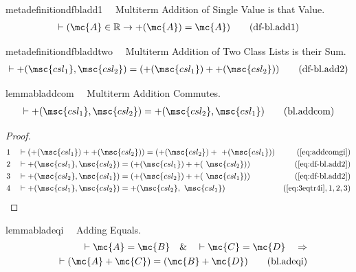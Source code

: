 \begin{restatable}{metadefinition}{dfbladd1}~~ Multiterm Addition of Single Value is
that Value.
\begin{align}
\vdash ( \mc{A} \in \mathbb{R} \rightarrow +( \mc{A} ) = \mc{A}
    )\label{eq:df-bl.add1}\tag{df-bl.add1}
\end{align}
\end{restatable}

\begin{restatable}{metadefinition}{dfbladdtwo}~~ Multiterm Addition of Two Class Lists
is their Sum.
\begin{align}
\vdash +( \msc{csl_1} , \msc{csl_2} ) = ( +( \msc{csl_1} ) + +( \msc{csl_2} )
    )\label{eq:df-bl.add2}\tag{df-bl.add2}
\end{align}
\end{restatable}

\begin{restatable}{lemma}{bladdcom}~~ Multiterm Addition Commutes.
\begin{align}
\vdash +( \msc{csl_1} , \msc{csl_2} ) = +( \msc{csl_2} , \msc{csl_1}
    )\label{eq:bl.addcom}\tag{bl.addcom}
\end{align}
\end{restatable}

\begin{proof}
\begin{align}
  1 &&  & \vdash ( +( \msc{csl_1} ) + +( \msc{csl_2} ) ) = ( +( \msc{csl_2} ) +
     ~+( \msc{csl_1} ) )&(\mbox{\ref{eq:addcomgi}})\notag
  \\ 2 &&  & \vdash +( \msc{csl_1} , \msc{csl_2} ) = ( +( \msc{csl_1} ) + +(
     ~\msc{csl_2} ) )&(\mbox{\ref{eq:df-bl.add2}})\notag
  \\ 3 &&  & \vdash +( \msc{csl_2} , \msc{csl_1} ) = ( +( \msc{csl_2} ) + +(
     ~\msc{csl_1} ) )&(\mbox{\ref{eq:df-bl.add2}})\notag
  \\ 4 &&  & \vdash +( \msc{csl_1} , \msc{csl_2} ) = +( \msc{csl_2} ,
     ~\msc{csl_1} )&(\mbox{\ref{eq:3eqtr4i}},1,2,3)\notag
\end{align}
\end{proof}

\begin{restatable}{lemma}{bladeqi}~~ Adding Equals.
\begin{align}
\vdash \mc{A} = \mc{B}\quad\&\quad \vdash \mc{C} = \mc{D}\quad\Rightarrow \notag \\ 
	\quad
    \vdash ( \mc{A} + \mc{C} ) = ( \mc{B} + \mc{D}
    )\label{eq:bl.adeqi}\tag{bl.adeqi}
\end{align}
\end{restatable}

